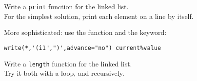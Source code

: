 \begin{exercise}
  \label{ex:flist-print}
  Write a \lstinline{print} function for the linked list.\\
  For the simplest solution, print each element on a line by itself.

  More sophisticated: use the  function and the
   keyword:
\begin{lstlisting}
write(*,'(i1",")',advance="no") current%value  
\end{lstlisting}
\end{exercise}

\begin{exercise}
  \label{ex:flist-length}
  Write a \lstinline{length} function for the linked list.\\
  Try it both with a loop, and recursively.
\end{exercise}


